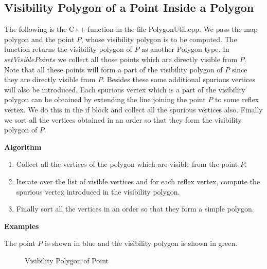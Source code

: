 \documentclass[a4paper,10pt]{article}
\begin{document}
\subsection{Visibility Polygon of a Point Inside a Polygon}

The following is the C++ function in the file PolygonUtil.cpp. We pass the map polygon and the point $P$, whose visibility polygon is to be
 computed. The function returns the visibility polygon of $P$ as another Polygon type.
In $setVisiblePoints$ we collect all those points which are directly visible from $P$. Note that
 all these points will form a part of the visibility polygon of $P$ since they are directly visible from $P$. 
Besides these some additional spurious vertices will also be introduced. Each spurious vertex which is a part of the visibility polygon
 can be obtained by extending the line joining the point $P$ to some reflex vertex. We do this in the if block and collect all the 
spurious vertices also. Finally we sort all the vertices obtained in an order so that they form the visibility polygon of $P$.



{\bf Algorithm}

\begin{enumerate}
 \item 
Collect all the vertices of the polygon which are visible from the point $P$.
\item
Iterate over the list of visible vertices and for each reflex vertex, compute the spurious vertex introduced in the visibility polygon.
\item
Finally sort all the vertices in an order so that they form a simple polygon.
\end{enumerate}

{\bf Examples}

The point $P$ is shown in blue and the visibility polygon is shown in green.

\begin{figure}[h]
\begin{center}
\caption{\label{fig:Visibility Polygon of Point}Visibility Polygon of Point}
\end{center}
\end{figure}
\end{document}
